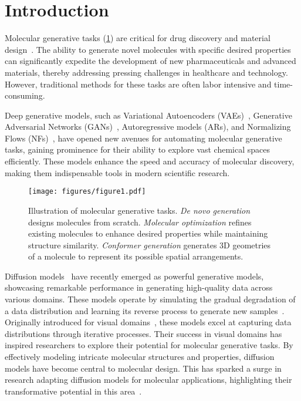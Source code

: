 \section{Introduction}

Molecular generative tasks (\cref{fig:overview}) are critical for drug discovery and material design~\citep{InverseDesignSurvey,MolGenSurvey1,MolGenSurvey2}. The ability to generate novel molecules with specific desired properties can significantly expedite the development of new pharmaceuticals and advanced materials, thereby addressing pressing challenges in healthcare and technology. However, traditional methods for these tasks are often labor intensive and time-consuming. 

Deep generative models, such as Variational Autoencoders (VAEs)~\citep{VAE}, Generative Adversarial Networks (GANs)~\citep{GAN}, Autoregressive models (ARs), and Normalizing Flows (NFs)~\citep{NormalizingFlow}, have opened new avenues for automating molecular generative tasks, gaining prominence for their ability to explore vast chemical spaces efficiently. These models enhance the speed and accuracy of molecular discovery, making them indispensable tools in modern scientific research.

\begin{figure}[t]
  \centering
  \texttt{[image: figures/figure1.pdf]}
  \caption{Illustration of molecular generative tasks. \textit{De novo generation} designs molecules from scratch. \textit{Molecular optimization} refines existing molecules to enhance desired properties while maintaining structure similarity. \textit{Conformer generation} generates 3D geometries of a molecule to represent its possible spatial arrangements.}
  \label{fig:overview}
  \vspace{-6pt}
\end{figure}

Diffusion models~\citep{Diffusion,DDPM} have recently emerged as powerful generative models, showcasing remarkable performance in generating high-quality data across various domains. 
These models operate by simulating the gradual degradation of a data distribution and learning its reverse process to generate new samples~\citep{understanding}. 
Originally introduced for visual domains~\citep{DiffusionVisionSruvey}, these models excel at capturing data distributions through iterative processes. Their success in visual domains has inspired researchers to explore their potential for molecular generative tasks. By effectively modeling intricate molecular structures and properties, diffusion models have become central to molecular design. This has sparked a surge in research adapting diffusion models for molecular applications, highlighting their transformative potential in this area~\citep{GDSS,EDM}.

